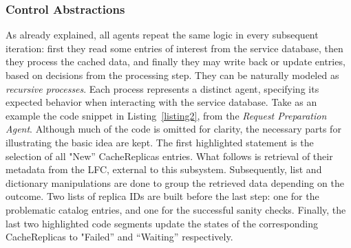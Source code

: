 \documentclass[sort&compress,preprint,3p]{elsarticle}
\begin{document}
\subsubsection{Control Abstractions}
As already explained, all agents repeat the same logic in every subsequent iteration: first they
read some entries of interest from the service database, then they process the cached data, and finally
they may write back or update entries, based on decisions from the processing step.
They can be naturally modeled as \textit{recursive processes}. Each process represents a distinct agent,
specifying its expected behavior when interacting with the service database.
Take as an example the code snippet
in Listing~\ref{listing2}, from the \textit{Request Preparation Agent}. 
Although much of the code is omitted for clarity, the necessary parts for
illustrating the basic idea are kept.
The first highlighted statement is the selection of all "New'' CacheReplicas
entries. What follows is retrieval of their metadata from the LFC,
external to this subsystem. Subsequently, list and dictionary manipulations
are done to group the retrieved data depending on the outcome.
Two lists of replica IDs are built before the last step: one for the problematic catalog entries,
and one for the successful sanity checks.
Finally, the last two highlighted code segments update the states 
of the corresponding CacheReplicas to "Failed'' and ``Waiting'' respectively.
\end{document}
